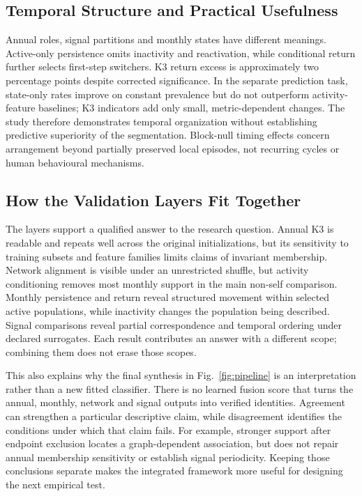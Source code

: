 \documentclass[journal,letterpaper]{IEEEtran}
\begin{document}
\subsection{Temporal Structure and Practical Usefulness}
Annual roles, signal partitions and monthly states have different meanings. Active-only persistence omits inactivity and reactivation, while conditional return further selects first-step switchers. K3 return excess is approximately two percentage points despite corrected significance. In the separate prediction task, state-only rates improve on constant prevalence but do not outperform activity-feature baselines; K3 indicators add only small, metric-dependent changes. The study therefore demonstrates temporal organization without establishing predictive superiority of the segmentation. Block-null timing effects concern arrangement beyond partially preserved local episodes, not recurring cycles or human behavioural mechanisms.

\subsection{How the Validation Layers Fit Together}
The layers support a qualified answer to the research question. Annual K3 is readable and repeats well across the original initializations, but its sensitivity to training subsets and feature families limits claims of invariant membership. Network alignment is visible under an unrestricted shuffle, but activity conditioning removes most monthly support in the main non-self comparison. Monthly persistence and return reveal structured movement within selected active populations, while inactivity changes the population being described. Signal comparisons reveal partial correspondence and temporal ordering under declared surrogates. Each result contributes an answer with a different scope; combining them does not erase those scopes.

This also explains why the final synthesis in Fig.~\ref{fig:pipeline} is an interpretation rather than a new fitted classifier. There is no learned fusion score that turns the annual, monthly, network and signal outputs into verified identities. Agreement can strengthen a particular descriptive claim, while disagreement identifies the conditions under which that claim fails. For example, stronger support after endpoint exclusion locates a graph-dependent association, but does not repair annual membership sensitivity or establish signal periodicity. Keeping those conclusions separate makes the integrated framework more useful for designing the next empirical test.
\end{document}
